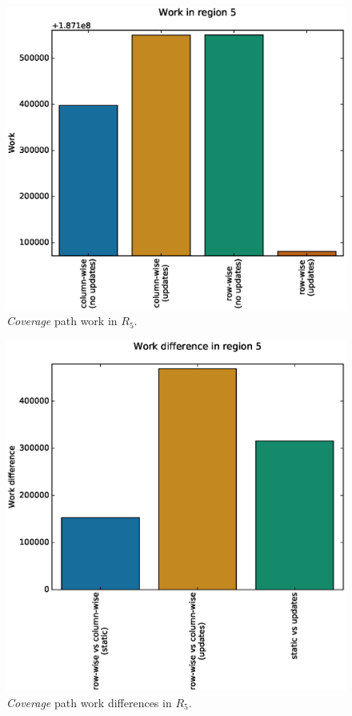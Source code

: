 \documentclass{tamuccthesis}
\begin{document}
\begin{figure}[H]
    \captionsetup{justification=centering}
    \centering
    \includegraphics[width=\textwidth,trim={0cm 0cm 0cm 0.75cm},clip]{work_r5.eps}
    \caption{\textit{Coverage} path work in $R_5$.}
    \label{fig:coverage_noterrain_work_r5}
\end{figure}
\begin{figure}[H]
    \captionsetup{justification=centering}
    \centering
    \includegraphics[width=\textwidth,trim={0cm 0cm 0cm 0.75cm},clip]{diff_r5.eps}
    \caption{\textit{Coverage} path work differences in $R_5$.}
    \label{fig:coverage_noterrain_diff_r5}
\end{figure}
\end{document}
